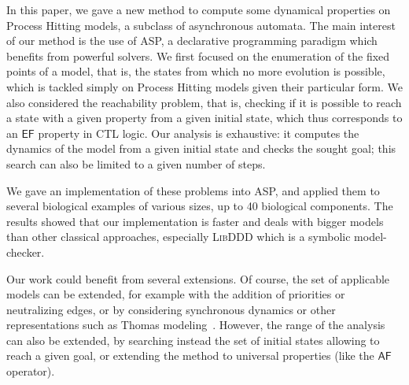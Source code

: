 In this paper, we gave a new method to compute some dynamical properties
on Process Hitting models, a subclass of asynchronous automata.
The main interest of our method is the use of ASP,
a declarative programming paradigm which benefits from powerful solvers.
We first focused on the enumeration of the fixed points of a model,
that is, the states from which no more evolution is possible,
which is tackled simply on Process Hitting models given their particular form.
We also considered the reachability problem, that is,
checking if it is possible to reach a state with a given property
from a given initial state,
which thus corresponds to an $\mathsf{EF}$ property in CTL logic.
Our analysis is exhaustive:
it computes the dynamics of the model from a given initial state and checks the sought goal;
this search can also be limited to a given number of steps.

We gave an implementation of these problems into ASP,
and applied them to several biological examples of various sizes, up to
40 biological components.
The results showed that our implementation is faster and deals with bigger models
than other classical approaches, especially \textsc{LibDDD} which is a symbolic model-checker.

Our work could benefit from several extensions.
Of course, the set of applicable models can be extended,
for example with the addition
of priorities or neutralizing edges,
or by considering synchronous dynamics or other representations
such as Thomas modeling~\cite{BernotSemBRN}.
However, the range of the analysis can also be extended,
by searching instead the set of initial states
allowing to reach a given goal,
or extending the method to universal properties (like the $\mathsf{AF}$ operator).

